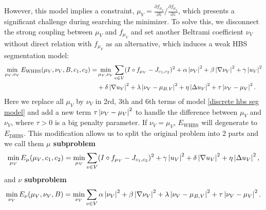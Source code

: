 \documentclass[review,onefignum,onetabnum]{siamonline190516}
\begin{document}
However, this model implies a constraint, $\mu_V = \frac{\partial f_{\mu_V}}{\partial \bar{z}} / \frac{\partial f_{\mu_V}}{\partial z}$, which presents a significant challenge during searching the minimizer. To solve this, we disconnect the strong coupling between $\mu_V$ and $f_{\mu_V}$ and set another Beltrami coefficient $\nu_{V}$ without direct relation with $f_{\mu_V}$ as an alternative, which induces a weak HBS segmentation model:
\begin{equation}\label{weak discrete hbs seg model}
    \begin{split}
        \min_{\mu_V, \nu_V} E_{\text{WHBS}}(\mu_V, \nu_V, B, c_1, c_2) = 
        & \min_{\mu_V, \nu_V} \sum_{v \in V}
        (I \circ f_{\mu_V} - J_{c_1,c_2})^2 
        + \alpha \abs{\nu_V}^2 + \beta \abs{\nabla \nu_V}^2 
        + \gamma \abs{u_V}^2 \\
        & + \delta \abs{\nabla u_V}^2
        + \lambda \abs{\nu_V - \mu_{B,V}}^2 + \eta \abs{\Delta u_V}^2 + \tau \abs{\nu_V - \mu_V}^2.
    \end{split}
\end{equation}
Here we replace all $\mu_V$ by $\nu_V$ in 2rd, 3th and 6th terms of model \ref{discrete hbs seg model} and add a new term $\tau \left\vert \nu_V - \mu_V \right\vert^2$ to handle the difference between $\mu_V$ and $\nu_V$, where $\tau > 0$ is a big penalty parameter. If $\nu_V = \mu_V$, $E_{\text{WHBS}}$ will degenerate to $E_{\text{DHBS}}$. This modification allows us to split the original problem into 2 parts and we call them \textbf{$\mu$ subproblem}
\begin{equation}\label{mu subproblem}
    \min_{\mu_V} E_{\mu}(\mu_V, c_1, c_2) = 
    \min_{\mu_V} \sum_{v \in V}
    (I \circ f_{\mu_V} - J_{c_1,c_2})^2 
    + \gamma \abs{u_V}^2 
    + \delta \abs{\nabla u_V}^2
    + \eta \abs{\Delta u_V}^2,
\end{equation}
and \textbf{$\nu$ subproblem}
\begin{equation}\label{nu subproblem}
    \min_{\nu_V} E_{\nu}(\mu_V, \nu_V, B) = 
    \min_{\nu_V} \sum_{v \in V}
    \alpha \abs{\nu_V}^2 + \beta \abs{\nabla \nu_V}^2 
    + \lambda \abs{\nu_V - \mu_{B,V}}^2 + \tau \abs{\nu_V - \mu_V}^2.
\end{equation}
\end{document}
